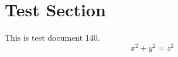 \documentclass{article}
\begin{document}
\section{Test Section}
This is test document 140.
\begin{equation}
x^2 + y^2 = z^2
\end{equation}
\end{document}
